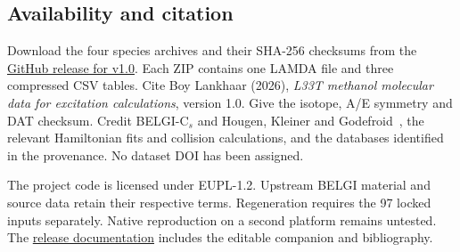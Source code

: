 \documentclass[11pt,a4paper]{article}
\begin{document}
\clearpage
\subsection{Availability and citation}
Download the four species archives and their SHA-256 checksums from the
\href{https://github.com/blankhaar/methanol-l33t/releases/tag/v1.0}{GitHub release for v1.0}.
Each ZIP contains one LAMDA file and three compressed CSV tables.
Cite Boy Lankhaar (2026), \emph{L33T methanol molecular data for excitation
calculations}, version 1.0. Give the isotope, A/E symmetry and DAT checksum.
Credit BELGI-C$_s$ and Hougen, Kleiner and Godefroid~\cite{Hougen_1994},
the relevant Hamiltonian fits and collision calculations, and the databases
identified in the provenance. No dataset DOI has been assigned.

The project code is licensed under EUPL-1.2. Upstream BELGI material and
source data retain their respective terms. Regeneration requires the 97 locked
inputs separately. Native reproduction on a second platform remains untested.
The \href{https://github.com/blankhaar/methanol-l33t/tree/v1.0/methanol-l33t/docs}{release documentation}
includes the editable companion and bibliography.

\bigskip
\begingroup
\small
\setlength{\bibsep}{2pt}


\endgroup
\end{document}
